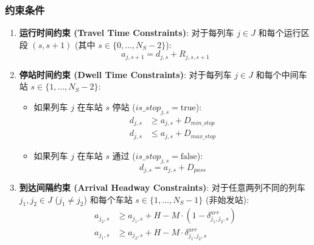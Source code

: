 \documentclass{article}
\begin{document}
    \subsubsection{约束条件}
    \begin{enumerate}
        \item \textbf{运行时间约束 (Travel Time Constraints)}: 对于每列车 $j \in J$
        和每个运行区段 $(s, s+1)$ (其中 $s \in \{0, \dots, N_S-2\}$):
        \begin{equation}
            a_{j,s+1} = d_{j,s} + R_{j,s,s+1}\label{eq:travel_time}
        \end{equation}

        \item \textbf{停站时间约束 (Dwell Time Constraints)}: 对于每列车 $j \in J$
        和每个中间车站 $s \in \{1, \dots, N_S-2\}$:
        \begin{itemize}
            \item 如果列车 $j$ 在车站 $s$ 停站 ($is\_stop_{j,s} = \text{true}$):
            \begin{equation}
                \begin{aligned}
                    d_{j,s} &\ge a_{j,s} + D_{min\_stop} \\
                    d_{j,s} &\le a_{j,s} + D_{max\_stop}
                \end{aligned}\label{eq:dwell_time}
            \end{equation}
            \item 如果列车 $j$ 在车站 $s$ 通过 ($is\_stop_{j,s} = \text{false}$):
            \begin{equation}
                d_{j,s} = a_{j,s} + D_{pass}\label{eq:dwell_time2}
            \end{equation}
        \end{itemize}

        \item \textbf{到达间隔约束 (Arrival Headway Constraints)}: 对于任意两列不同的列车
        $j_1, j_2 \in J$ ($j_1 \neq j_2$) 和每个车站 $s \in \{1, \dots,
        N_S-1\}$ (非始发站):
        \begin{equation}
            \begin{aligned}
                a_{j_2,s} &\ge a_{j_1,s} + H - M \cdot (1 -
                \delta^{arr}_{j_1,j_2,s}) \\
                a_{j_1,s} &\ge a_{j_2,s} + H - M \cdot \delta^{arr}_{j_1,j_2,s}
            \end{aligned}\label{eq:arrival_headway}
        \end{equation}


\end{enumerate}
\end{document}
